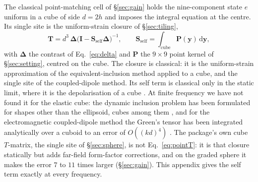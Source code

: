 \documentclass[11pt,a4paper]{article}
\newcommand{\bD}{\boldsymbol{\Delta}}
\newcommand{\bI}{\mathbf{I}}
\newcommand{\bS}{\mathbf{S}}
\newcommand{\bT}{\mathbf{T}}
\newcommand{\bP}{\mathbf{P}}
\newcommand{\dd}{\mathrm{d}}
\begin{document}
The classical point-matching cell of \S\ref{sec:gain} holds the nine-component state $e$ uniform in a
cube of side $d=2h$ and imposes the integral equation at the centre. Its single site is the
uniform-strain closure of \S\ref{sec:tiling},
\begin{equation}\label{eq:pointT}
  \bT=d^3\,\bD\bigl(\bI-\bS_{\text{self}}\bD\bigr)^{-1},
  \qquad
  \bS_{\text{self}}=\int_{\text{cube}}\bP(\mathbf y)\,\dd\mathbf y ,
\end{equation}
with $\bD$ the contrast of Eq.~\eqref{eq:delta} and $\bP$ the $9\times9$ point kernel of
\S\ref{sec:setting}, centred on the cube. The closure is classical: it is the uniform-strain approximation
of the equivalent-inclusion method \citep{Eshelby1957,Mura1987} applied to a cube, and the single site of
the coupled-dipole method. Its self term is classical only in the static limit, where it is the
depolarisation of a cube \citep{Chiu1977,Nozaki2001}. At finite frequency we have not found it for the
elastic cube: the dynamic inclusion problem has been formulated for shapes other than the ellipsoid,
cubes among them \citep{WangMichelitsch2005}, and for the electromagnetic coupled-dipole method the
Green's tensor has been integrated analytically over a cuboid to an error of $O((kd)^4)$
\citep{YurkinSmunev2023}. The package's own cube $T$-matrix, the single site of \S\ref{sec:sphere}, is
not Eq.~\eqref{eq:pointT}: it is that closure statically but adds far-field form-factor corrections,
and on the graded sphere it makes the error $7$ to $11$ times larger (\S\ref{sec:gain}). This appendix
gives the self term exactly at every frequency.
\end{document}
